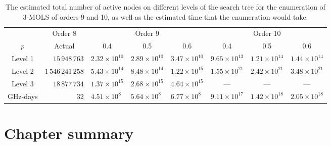 \begin{table}[t]
\begin{tabular}{ crllllll }
\toprule
 & \multicolumn{1}{c}{ Order 8} & \multicolumn{3}{c}{Order 9}  & \multicolumn{3}{c}{Order 10}   \\ 
\cmidrule(lr){2-2} \cmidrule(lr){3-5}\cmidrule(lr){6-8}
$p$ & \multicolumn{1}{c}{Actual} & \multicolumn{1}{c}{0.4} & \multicolumn{1}{c}{0.5} &\multicolumn{1}{c}{0.6} & \multicolumn{1}{c}{0.4} & \multicolumn{1}{c}{0.5} &\multicolumn{1}{c}{0.6} \\ \midrule[\lightrulewidth]
Level 1 & $15\,948\,763$ & $2.32\times 10^{10}$ & $2.89\times 10^{10}$ & $3.47\times 10^{10}$  & $9.65\times 10^{13}$ & $1.21\times 10^{14}$ & $1.44\times 10^{14}$ \\ 
Level 2 & $1\,546\,241\,258$ & $5.43\times 10^{14}$ & $8.48\times 10^{14}$ & $1.22\times 10^{15}$  & $1.55\times 10^{21}$ & $2.42\times 10^{21}$ & $3.48\times 10^{21}$ \\ 
Level 3 & $18\,877\,734$ & $1.37\times 10^{15}$ & $2.68\times 10^{15}$ & $4.64\times 10^{15}$  & \multicolumn{1}{c}{---}  & \multicolumn{1}{c}{---}  &  \multicolumn{1}{c}{---} \\ \midrule[\lightrulewidth]
GHz-days   & 32& $4.51\times 10^{8}$ & $5.64\times 10^{8}$ & $6.77\times 10^{8}$&$9.11\times 10^{17}$&$1.42\times 10^{18}$&$2.05\times 10^{18}$\\ \bottomrule
\end{tabular} \vspace*{.4cm}
\caption{The estimated total number of active nodes on different levels of the search tree for the enumeration of 3-MOLS of orders 9 and 10, as well as the estimated  time that the enumeration would take.}
\label{activenodes} 
\end{table}

\section{Chapter summary}
